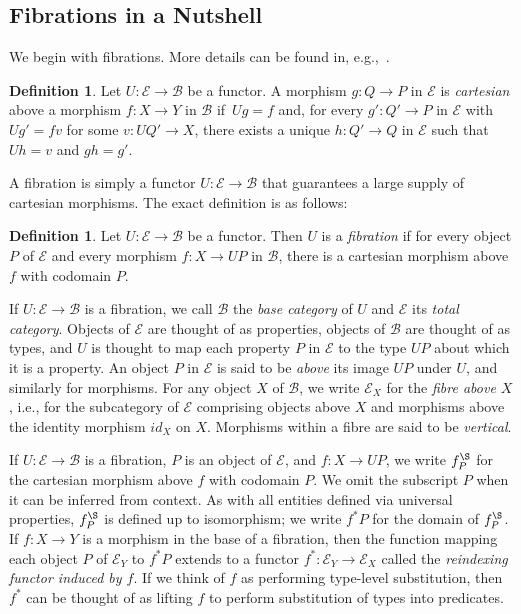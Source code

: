 \documentclass{LMCS}
\newcommand{\ra}{\rightarrow}
\newcommand\E{{\mathcal E}}
\newcommand\B{{\mathcal B}}
\theoremstyle{plain}
\theoremstyle{remark}
\theoremstyle{definition}
\newtheorem{definition}[theorem]{Definition}
\begin{document}
\subsection{Fibrations in a Nutshell}\label{sec:nutshell} 

We begin with fibrations. More details can be found in,
e.g.,~\cite{jac99,pav90}.
\begin{definition}
  Let $U : \E \ra \B$ be a functor. A morphism $g : Q \ra P$ in $\E$
  is {\em cartesian} above a morphism $f : X \ra Y$ in $\B$ if\, $Ug =
  f$ and, for every $g' : Q' \ra P$ in $\E$ with $Ug' = f v$ for
  some $v : UQ' \ra X$, there exists a unique $h : Q' \ra Q$ in $\E$
  such that $Uh = v$ and $g h = g'$.
\end{definition}

\noindent
A fibration is simply a functor $U:\E \ra \B$ that guarantees a large
supply of cartesian morphisms. The exact definition is as follows:

\begin{definition}
  Let $U : \E \ra \B$ be a functor. Then $U$ is a {\em fibration} if
  for every object $P$ of $\E$ and every morphism $f : X \ra UP$ in
  $\B$, there is a cartesian morphism above $f$ with codomain $P$. 
\end{definition}
If $U : \E \to \B$ is a fibration, we call $\B$ the {\em base
  category} of $U$ and $\E$ its {\em total category}. Objects of $\E$
are thought of as properties, objects of $\B$ are thought of as types,
and $U$ is thought to map each property $P$ in $\E$ to the type $UP$
about which it is a property. An object $P$ in $\E$ is said to be
\emph{above} its image $UP$ under $U$, and similarly for
morphisms. For any object $X$ of $\B$, we write $\E_X$ for the {\em
  fibre above $X$}, i.e., for the subcategory of $\E$ comprising
objects above $X$ and morphisms above the identity morphism $id_X$ on
$X$. Morphisms within a fibre are said to be {\em vertical}.

If $U:\E \ra \B$ is a fibration, $P$ is an object of $\E$, and $f : X
\ra UP$, we write $f^\S_P$ for the cartesian morphism above $f$ with
codomain $P$.  We omit the subscript $P$ when it can be inferred from
context. As with all entities defined via universal properties,
$f^\S_P$ is defined up to isomorphism; we write $f^*P$ for the domain
of $f^\S_P$. If $f : X \ra Y$ is a morphism in the base of a
fibration, then the function mapping each object $P$ of $\E_Y$ to
$f^*P$ extends to a functor $f^* : \E_Y \to \E_X$ called the {\em
  reindexing functor induced by $f$}. If we think of $f$ as performing
type-level substitution, then $f^*$ can be thought of as lifting $f$
to perform substitution of types into predicates.
\end{document}
